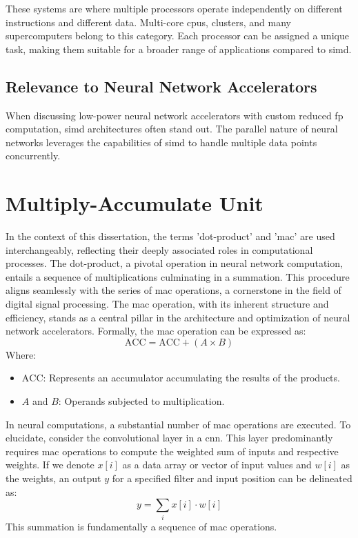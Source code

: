 These systems are where multiple processors operate independently on different instructions and different data. Multi-core \glspl{cpu}, clusters, and many supercomputers belong to this category. Each processor can be assigned a unique task, making them suitable for a broader range of applications compared to \gls{simd}.

\subsection*{Relevance to Neural Network Accelerators}

When discussing low-power neural network accelerators with custom reduced \gls{fp} computation, \gls{simd} architectures often stand out. The parallel nature of neural networks leverages the capabilities of \gls{simd} to handle multiple data points concurrently.

\section{Multiply-Accumulate Unit}

In the context of this dissertation, the terms 'dot-product' and '\gls{mac}' are used interchangeably, reflecting their deeply associated roles in computational processes. The dot-product, a pivotal operation in neural network computation, entails a sequence of multiplications culminating in a summation. This procedure aligns seamlessly with the series of \gls{mac} operations, a cornerstone in the field of digital signal processing. The \gls{mac} operation, with its inherent structure and efficiency, stands as a central pillar in the architecture and optimization of neural network accelerators. Formally, the \gls{mac} operation can be expressed as:
\begin{equation}
\text{ACC} = \text{ACC} + (A \times B)
\end{equation}
Where:
\begin{itemize}
	\item \( \text{ACC} \): Represents an accumulator accumulating the results of the products.
	\item \( A \) and \( B \): Operands subjected to multiplication.
\end{itemize}

In neural computations, a substantial number of \gls{mac} operations are executed. To elucidate, consider the convolutional layer in a \gls{cnn}. This layer predominantly requires \gls{mac} operations to compute the weighted sum of inputs and respective weights. If we denote \( x[i] \) as a data array or vector of input values and \( w[i] \) as the weights, an output \( y \) for a specified filter and input position can be delineated as:
\begin{equation}
y = \sum_{i} x[i] \cdot w[i]
\end{equation}
This summation is fundamentally a sequence of \gls{mac} operations.

